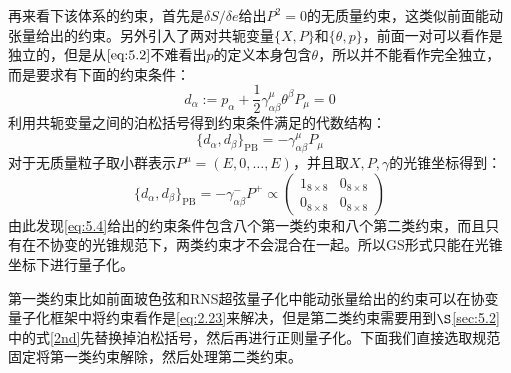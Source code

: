 再来看下该体系的约束，首先是$\delta S/\delta e$给出$P^2=0$的无质量约束，这类似前面能动张量给出的约束。另外引入了两对共轭变量$\{X,P\}$和$\{\theta,p\}$，前面一对可以看作是独立的，但是从$\ref{eq:5.2}$不难看出$p$的定义本身包含$\theta$，所以并不能看作完全独立，而是要求有下面的约束条件：
\begin{equation}
	d_\alpha:=p_\alpha+\frac{1}{2}\gamma_{\alpha\beta}^\mu\theta^\beta P_\mu=0
\end{equation}
利用共轭变量之间的泊松括号得到约束条件满足的代数结构：
\begin{equation}
	\label{eq:5.4}
	\{d_\alpha,d_\beta\}_{\mathrm{PB}}=-\gamma_{\alpha\beta}^\mu P_\mu
\end{equation}
对于无质量粒子取小群表示$P^\mu=(E,0,\ldots,E)$，并且取$X,P,\gamma$的光锥坐标得到：
\begin{equation}
	\label{eq:5.5}
	\{d_\alpha,d_\beta\}_{\mathrm{PB}}=-\gamma_{\alpha\beta}^-P^+\propto\begin{pmatrix}{1}_{8\times8}&{0}_{8\times8}\\{0}_{8\times8}&{0}_{8\times8}\end{pmatrix}
\end{equation}
由此发现\ref{eq:5.4}给出的约束条件包含八个第一类约束和八个第二类约束，而且只有在不协变的光锥规范下，两类约束才不会混合在一起。所以GS形式只能在光锥坐标下进行量子化。

第一类约束比如前面玻色弦和RNS超弦量子化中能动张量给出的约束可以在协变量子化框架中将约束看作是\ref{eq:2.23}来解决，但是第二类约束需要用到$\S$\ref{sec:5.2}中的式\ref{2nd}先替换掉泊松括号，然后再进行正则量子化。下面我们直接选取规范固定将第一类约束解除，然后处理第二类约束。

